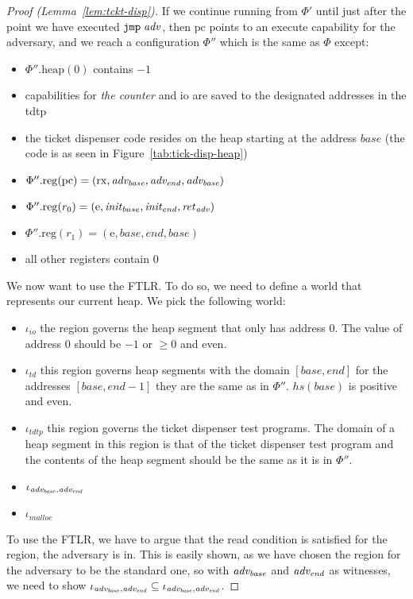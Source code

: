\documentclass{article}
\newcommand{\var}[1]{\mathit{#1}}
\newcommand{\hs}{\var{hs}}
\newcommand{\pcreg}{\mathrm{pc}}
\newcommand{\plainproj}[1]{\mathrm{#1}}
\newcommand{\memheap}[1][\Phi]{#1.\plainproj{heap}}
\newcommand{\memreg}[1][\Phi]{#1.\plainproj{reg}}
\newcommand{\codelabel}[1]{\mathit{#1}}
\newcommand{\malloc}{\codelabel{malloc}}
\newcommand{\zinstr}[1]{\mathtt{#1}}
\newcommand{\oneinstr}[2]{\zinstr{#1} \; #2}
\newcommand{\jmp}[1]{\oneinstr{jmp}{#1}}
\newcommand{\plainperm}[1]{\mathrm{#1}}
\newcommand{\exec}{\plainperm{rx}}
\newcommand{\entry}{\plainperm{e}}
\begin{document}
\begin{proof}[Proof (Lemma~\ref{lem:tckt-disp})]
If we continue running from $\Phi'$ until just after the point we have executed $\jmp{\adv}$, then  $\pcreg$ points to an execute capability for the adversary, and  we reach a configuration $\Phi''$ which is the same as $\Phi$ except:
\begin{itemize}
\item $\memheap[\Phi''](0)$ contains $-1$
\item capabilities for \emph{the counter} and io are saved to the designated addresses in the tdtp
\item the ticket dispenser code resides on the heap starting at the address $\var{base}$ (the code is as seen in Figure~\ref{tab:tick-disp-heap})
\item $\memreg[\Phi''](\pcreg) = (\exec,\advb,\adve,\advb)$
\item $\memreg[\Phi''](r_0) = (\entry,\initb,\inite,\reta)$
\item $\memreg[\Phi''](r_1) = (\entry,\var{base},\var{end},\var{base})$
\item all other registers contain 0
\end{itemize}
We now want to use the FTLR. To do so, we need to define a world that represents our current heap. We pick the following world:
\begin{itemize}
\item $\iota_{\var{io}}$ the region governs the heap segment that only has address $0$. The value of address $0$ should be $-1$ or $\geq 0$ and even.  %
\item $\iota_{\var{td}}$ this region governs heap segments with the domain $[\var{base},\var{end}]$ for the addresses $[\var{base},\var{end} - 1]$ they are the same as in $\Phi''$. $\hs(\var{base})$ is positive and even.
\item $\iota_{\var{tdtp}}$ this region governs the ticket dispenser test programs. The domain of a heap segment in this region is that of the ticket dispenser test program and the contents of the heap segment should be the same as it is in $\Phi''$.
\item $\iota_{\advb,\adve}$
\item $\iota_{\malloc}$
\end{itemize}
To use the FTLR, we have to argue that the read condition is satisfied for the region, the adversary is in. This is easily shown, as we have chosen the region for the adversary to be the standard one, so with $\advb$ and $\adve$ as witnesses, we need to show $\iota_{\advb,\adve} \subseteq \iota_{\advb,\adve}$.


\end{proof}
\end{document}
